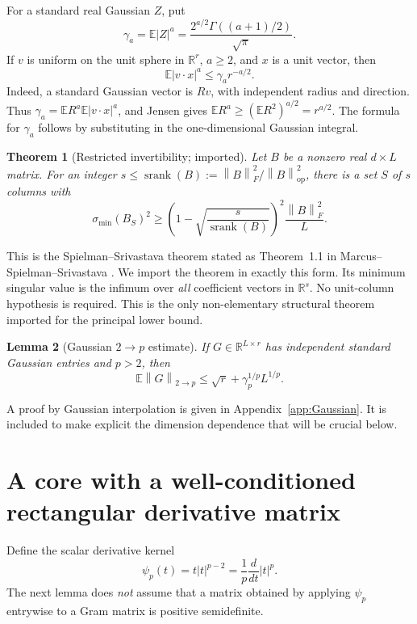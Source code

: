 \documentclass[11pt,letterpaper]{article}
\newtheorem{theorem}{Theorem}[section]
\newtheorem{lemma}[theorem]{Lemma}
\theoremstyle{definition}
\theoremstyle{remark}
\numberwithin{equation}{section}
\newcommand{\R}{\mathbb R}
\newcommand{\E}{\mathbb E}
\newcommand{\norm}[1]{\left\lVert#1\right\rVert}
\DeclareMathOperator{\sr}{srank}
\begin{document}
For a standard real Gaussian $Z$, put
\begin{equation}\label{eq:gamma}
 \gamma_a=\E|Z|^a=\frac{2^{a/2}\Gamma((a+1)/2)}{\sqrt\pi}.
\end{equation}
If $v$ is uniform on the unit sphere in $\R^r$, $a\ge2$, and $x$ is a unit vector, then
\begin{equation}\label{eq:spherical}
 \E|v\cdot x|^a\le\gamma_a r^{-a/2}.
\end{equation}
Indeed, a standard Gaussian vector is $Rv$, with independent radius and direction. Thus $\gamma_a=\E R^a\E|v\cdot x|^a$, and Jensen gives $\E R^a\ge(\E R^2)^{a/2}=r^{a/2}$. The formula for $\gamma_a$ follows by substituting in the one-dimensional Gaussian integral.

\begin{theorem}[Restricted invertibility; imported]\label{thm:RI}
Let $B$ be a nonzero real $d\times L$ matrix. For an integer $s\le\sr(B):=\norm{B}_F^2/\norm{B}_{\mathrm{op}}^2$, there is a set $S$ of $s$ columns with
\begin{equation}\label{eq:RI}
 \sigma_{\min}(B_S)^2\ge
 \left(1-\sqrt{\frac{s}{\sr(B)}}\right)^2\frac{\norm{B}_F^2}{L}.
\end{equation}
\end{theorem}
This is the Spielman--Srivastava theorem stated as Theorem~1.1 in Marcus--Spielman--Srivastava \cite{MSS}. We import the theorem in exactly this form. Its minimum singular value is the infimum over \emph{all} coefficient vectors in $\R^s$. No unit-column hypothesis is required. This is the only non-elementary structural theorem imported for the principal lower bound.

\begin{lemma}[Gaussian $2\!\to\!p$ estimate]\label{lem:Gaussian}
If $G\in\R^{L\times r}$ has independent standard Gaussian entries and $p>2$, then
\begin{equation}\label{eq:Gaussian}
 \E\norm{G}_{2\to p}\le\sqrt r+\gamma_p^{1/p}L^{1/p}.
\end{equation}
\end{lemma}
A proof by Gaussian interpolation is given in Appendix~\ref{app:Gaussian}. It is included to make explicit the dimension dependence that will be crucial below.

\section{A core with a well-conditioned rectangular derivative matrix}\label{sec:core}
Define the scalar derivative kernel
\begin{equation}\label{eq:psi}
 \psi_p(t)=t|t|^{p-2}=\frac1p\frac{d}{dt}|t|^p.
\end{equation}
The next lemma does \emph{not} assume that a matrix obtained by applying $\psi_p$ entrywise to a Gram matrix is positive semidefinite.
\end{document}
